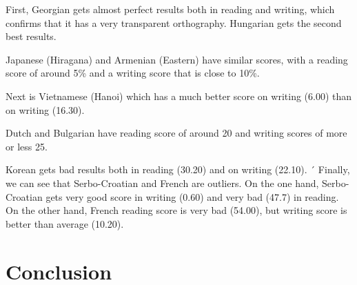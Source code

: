 \documentclass[11pt,a4paper]{article}
\begin{document}
First, Georgian gets almost perfect results both in reading and writing, which confirms that it has a very transparent orthography. Hungarian gets the second best results.

Japanese (Hiragana) and Armenian (Eastern) have similar scores, with a reading score of around 5\% and a writing score that is close to 10\%.

Next is Vietnamese (Hanoi) which has a much better score on writing (6.00) than  on writing (16.30).

Dutch and Bulgarian have reading score of around 20 and writing scores of more or less 25.

Korean gets bad results both in reading (30.20) and on writing (22.10).
´
Finally, we can see that Serbo-Croatian and French are outliers. On the one hand, Serbo-Croatian gets very good score in writing (0.60) and very bad (47.7) in reading. On the other hand, French reading score is very bad (54.00), but writing score is better than average (10.20).

\section{Conclusion}



\end{document}

